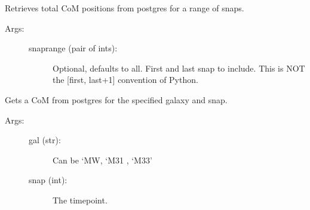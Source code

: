 \documentclass[letterpaper,10pt,english]{sphinxmanual}
\begin{document}
\begin{fulllineitems}
\begin{fulllineitems}
\begin{description}
\begin{description}
\end{description}

\end{description}

\end{fulllineitems}


\begin{fulllineitems}
\label{\detokenize{timecourse:galaxy.timecourse.TimeCourse.read_total_com_db}}
Retrieves total CoM positions from postgres for a range of snaps.
\begin{description}
\item[{Args:}] \leavevmode\begin{description}
\item[{snaprange (pair of ints):}] \leavevmode
Optional, defaults to all. First and last snap to include.
This is NOT the {[}first, last+1{]} convention of Python.

\end{description}

\end{description}

\end{fulllineitems}


\begin{fulllineitems}
\label{\detokenize{timecourse:galaxy.timecourse.TimeCourse.get_one_com}}
Gets a CoM from postgres for the specified galaxy and snap.
\begin{description}
\item[{Args:}] \leavevmode\begin{description}
\item[{gal (str): }] \leavevmode
Can be ‘MW, ‘M31 , ‘M33’

\item[{snap (int):}] \leavevmode
The timepoint.

\end{description}

\end{description}


\end{fulllineitems}
\end{fulllineitems}
\end{document}
